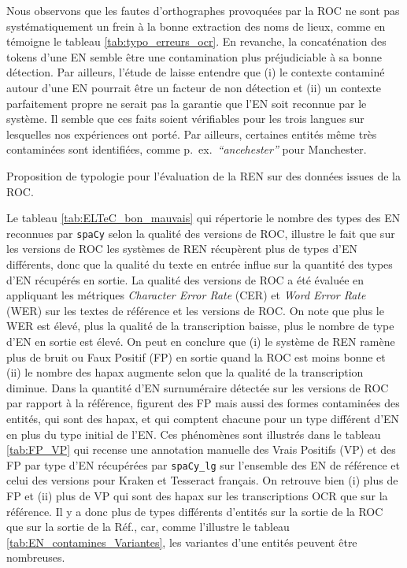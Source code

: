 Nous observons que les fautes d'orthographes provoquées par la ROC ne sont pas systématiquement un frein à la bonne extraction des noms de lieux, comme en témoigne le tableau \ref{tab:typo_erreurs_ocr}. En revanche, la concaténation des tokens d'une EN semble être une contamination plus préjudiciable à sa bonne détection. Par ailleurs, l'étude de \cite{DBLP:conf/gis/Koudoro-Parfait21} laisse entendre que (i) le contexte contaminé autour d'une EN pourrait être un facteur de non détection et (ii) un contexte parfaitement propre ne serait pas la garantie que l'EN soit reconnue par le système. Il semble que ces faits soient vérifiables pour les trois langues sur lesquelles nos expériences ont porté. Par ailleurs, certaines entités même très contaminées sont identifiées, comme p.\ ex.\  \textit{``ancehester''} pour \og{}Manchester\fg{}. 

\begin{table}[h!]
\small
    \centering
   
    \caption{Proposition de typologie pour l'évaluation de la REN sur des données issues de la ROC.}
    \label{tab:typo_erreurs_ocr}
\end{table}

Le tableau \ref{tab:ELTeC_bon_mauvais} qui répertorie le nombre des types des EN reconnues par \texttt{spaCy} selon la qualité des versions de ROC, illustre le fait que sur les versions de ROC les systèmes de REN récupèrent plus de types d'EN différents, donc que la qualité du texte en entrée influe sur la quantité des types d'EN récupérés en sortie. La qualité des versions de ROC a été évaluée en appliquant les métriques \textit{Character Error Rate} (CER) et \textit{Word Error Rate} (WER) sur les textes de référence et les versions de ROC. On note que plus le WER est élevé, plus la qualité de la transcription baisse, plus le nombre de type d'EN en sortie est élevé. On peut en conclure que (i) le système de REN ramène plus de bruit ou Faux Positif (FP) en sortie quand la ROC est moins bonne et (ii) le nombre des hapax augmente selon que la qualité de la transcription diminue. 
Dans la quantité d'EN surnuméraire détectée sur les versions de ROC par rapport à la référence, figurent des FP mais aussi des formes contaminées des entités, qui sont des hapax, et qui comptent chacune pour un type différent d'EN en plus du type initial de l'EN. Ces phénomènes sont illustrés dans le tableau \ref{tab:FP_VP} qui recense une annotation manuelle des Vrais Positifs (VP) et des FP par type d'EN récupérées par \texttt{spaCy\_lg} sur l'ensemble des EN de référence et celui des versions pour Kraken et Tesseract français. On retrouve bien (i) plus de FP et (ii) plus de VP qui sont des hapax sur les transcriptions OCR que sur la référence. Il y a donc plus de types différents d'entités sur la sortie de la ROC que sur la sortie de la Réf., car, comme l'illustre le tableau \ref{tab:EN_contamines_Variantes}, les variantes d'une entités peuvent être nombreuses. 


